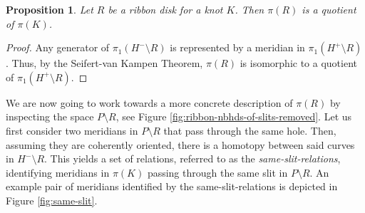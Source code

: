 \documentclass{article}
\newtheorem{proposition}{Proposition}
\theoremstyle{definition}
\begin{document}
\begin{proposition}
Let $R$ be a ribbon disk for a knot $K$. Then $\pi(R)$ is a quotient of $\pi(K)$.
\end{proposition}

\begin{proof}
Any generator of $\pi_1(H^- \setminus R)$ is represented by a meridian in $\pi_1(H^+ \setminus R)$. Thus, by the Seifert-van Kampen Theorem, $\pi(R)$ is isomorphic to a quotient of $\pi_1(H^+ \setminus R)$.
\end{proof}

We are now going to work towards a more concrete description of $\pi(R)$ by inspecting the space $P \setminus R$, see Figure \ref{fig:ribbon-nbhds-of-slits-removed}. Let us first consider two meridians in $P \setminus R$ that pass through the same hole. Then, assuming they are coherently oriented, there is a homotopy between said curves in $H^- \setminus R$. This yields a set of relations, referred to as the \textit{same-slit-relations}, identifying meridians in $\pi(K)$ passing through the same slit in $P \setminus R$. An example pair of meridians identified by the same-slit-relations is depicted in Figure \ref{fig:same-slit}.
\end{document}
